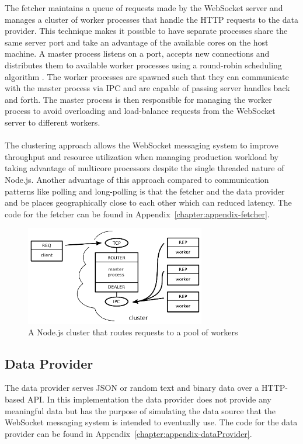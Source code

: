 The fetcher maintains a queue of requests made by the WebSocket server and manages a cluster of worker processes that handle the HTTP requests to the data provider. This technique makes it possible to have separate processes share the same server port and take an advantage of the available cores on the host machine. A master process listens on a port, accepts new connections and distributes them to available worker processes using a round-robin scheduling algorithm \cite{nodeCluster}. The worker processes are spawned such that they can communicate with the master process via IPC and are capable of passing server handles back and forth. The master process is then responsible for managing the worker process to avoid overloading and load-balance requests from the WebSocket server to different workers.
\\ \\
The clustering approach allows the WebSocket messaging system to improve throughput and resource utilization when managing production workload by taking advantage of multicore processors despite the single threaded nature of Node.js. Another advantage of this approach compared to communication patterns like polling and long-polling is that the fetcher and the data provider and be places geographically close to each other which can reduced latency. The code for the fetcher can be found in Appendix~\ref{chapter:appendix-fetcher}.
\\
\begin{figure}[h!]
	\centering
	\label{fig:webSocketMessagingSystem}\includegraphics[width=0.7\textwidth]{images/poolOfWorkers}
	\caption{A Node.js cluster that routes requests to a pool of workers \cite{judd2008node}}
\end{figure}

\subsection{Data Provider}

The data provider serves JSON or random text and binary data over a HTTP-based API. In this implementation the data provider does not provide any meaningful data but has the purpose of simulating the data source that the WebSocket messaging system is intended to eventually use. The code for the data provider can be found in Appendix~\ref{chapter:appendix-dataProvider}.

